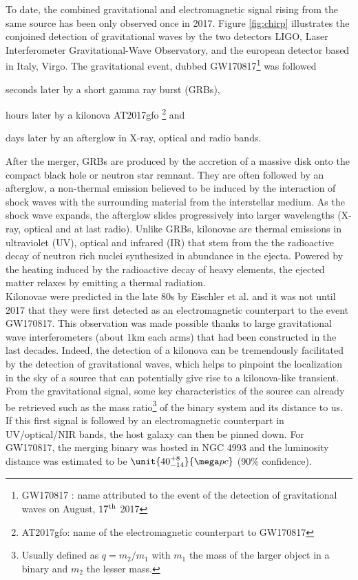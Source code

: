 \documentclass[a4paper, twoside, 11pt]{article}
\numberwithin{equation}{section}
\begin{document}
To date, the combined gravitational and electromagnetic signal rising from the same source has been only observed once in 2017. Figure \ref{fig:chirp} illustrates the conjoined detection of gravitational waves by the two detectors LIGO, Laser Interferometer Gravitational-Wave Observatory,  and the european detector based in Italy, Virgo. The gravitational event, dubbed  GW170817\footnote{\label{foot:names}GW170817 : name attributed to the event of the detection of gravitational waves on August, $\rm{17^{th}}$ 2017} was followed 
\begin{enumerate*}[label=\roman*) ]
\item  seconds later by a short gamma ray burst (GRBs), 
\item hours later by a kilonova AT2017gfo \footnote{AT2017gfo: name of the electromagnetic counterpart to GW170817} and
\item  days later by an afterglow in X-ray, optical and radio bands\cite{kilonovaDetection}.
\end{enumerate*}
  After the merger, GRBs are produced by the accretion of a massive disk onto the compact black hole or neutron star remnant. They are often followed by an afterglow, a non-thermal emission believed to be induced by the interaction of shock waves with the surrounding material from the interstellar medium. As the shock wave expands, the afterglow slides progressively into larger wavelengths (X-ray, optical and at last radio). Unlike GRBs, kilonovae are thermal emissions in ultraviolet (UV), optical and infrared (IR) that stem from the the radioactive decay of neutron rich nuclei synthesized in abundance in the ejecta. Powered by the heating induced by the radioactive decay of heavy elements, the ejected matter relaxes by emitting a thermal radiation. \\

	Kilonovae were predicted in the late 80s by Eischler et al.\cite{prediction_Kn} and it was not until 2017 that they were first detected as an electromagnetic counterpart to the event GW170817. This observation was made possible thanks to large gravitational wave interferometers  (about 1km each arms) that  had been constructed in the last decades. Indeed, the detection of a kilonova can be tremendously facilitated by the detection of gravitational waves, which helps to pinpoint the localization in the sky of a source that can potentially give rise to a kilonova-like transient.  From the gravitational signal, some key characteristics of the source can already be retrieved such as the mass ratio\footnote{Usually defined as \( q=m_2/m_1\) with $m_1$ the mass of the larger object in a binary and $m_2$ the lesser mass.} of the binary system and its distance to us. If this first signal is followed by an electromagnetic counterpart in UV/optical/NIR bands, the host galaxy can then be pinned down.  For GW170817, the merging binary was hosted in NGC 4993 and the luminosity distance was estimated to be $\unit{40_{-14}^{+8}}{\mega pc}$ (90$\%$ confidence)\cite{kilonovaDetection}. \\
	
\end{document}
